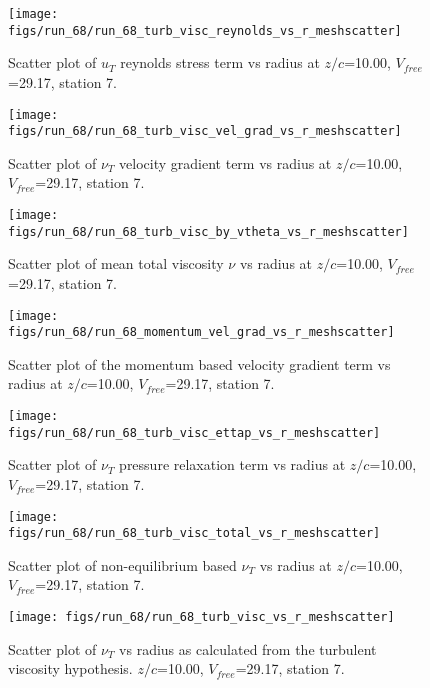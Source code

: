 \begin{figure}[H]
\centering
\texttt{[image: figs/run\_68/run\_68\_turb\_visc\_reynolds\_vs\_r\_meshscatter]}
\caption{Scatter plot of $
u_T$ reynolds stress term vs radius at $z/c$=10.00, $V_{free}$=29.17, station 7.}
\end{figure}


\begin{figure}[H]
\centering
\texttt{[image: figs/run\_68/run\_68\_turb\_visc\_vel\_grad\_vs\_r\_meshscatter]}
\caption{Scatter plot of $\nu_T$ velocity gradient term vs radius at $z/c$=10.00, $V_{free}$=29.17, station 7.}
\end{figure}


\begin{figure}[H]
\centering
\texttt{[image: figs/run\_68/run\_68\_turb\_visc\_by\_vtheta\_vs\_r\_meshscatter]}
\caption{Scatter plot of mean total viscosity $\nu$ vs radius at $z/c$=10.00, $V_{free}$=29.17, station 7.}
\end{figure}


\begin{figure}[H]
\centering
\texttt{[image: figs/run\_68/run\_68\_momentum\_vel\_grad\_vs\_r\_meshscatter]}
\caption{Scatter plot of the momentum based velocity gradient term vs radius at $z/c$=10.00, $V_{free}$=29.17, station 7.}
\end{figure}


\begin{figure}[H]
\centering
\texttt{[image: figs/run\_68/run\_68\_turb\_visc\_ettap\_vs\_r\_meshscatter]}
\caption{Scatter plot of $\nu_T$ pressure relaxation term vs radius at $z/c$=10.00, $V_{free}$=29.17, station 7.}
\end{figure}


\begin{figure}[H]
\centering
\texttt{[image: figs/run\_68/run\_68\_turb\_visc\_total\_vs\_r\_meshscatter]}
\caption{Scatter plot of non-equilibrium based $\nu_T$ vs radius at $z/c$=10.00, $V_{free}$=29.17, station 7.}
\end{figure}


\begin{figure}[H]
\centering
\texttt{[image: figs/run\_68/run\_68\_turb\_visc\_vs\_r\_meshscatter]}
\caption{Scatter plot of $\nu_T$ vs radius as calculated from the turbulent viscosity hypothesis. $z/c$=10.00, $V_{free}$=29.17, station 7.}
\end{figure}


